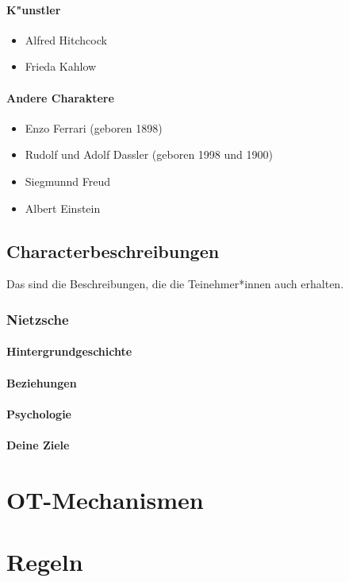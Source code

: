 \documentclass[12pt, a4paper, openany]{report}
\begin{document}
\subsubsection{K"unstler}
\begin{itemize}
	\item Alfred Hitchcock
	\item Frieda Kahlow
\end{itemize}

\subsubsection{Andere Charaktere}
\begin{itemize}
	\item Enzo Ferrari (geboren 1898)
	\item Rudolf und Adolf Dassler (geboren 1998 und 1900)
	\item Siegmunnd Freud
	\item Albert Einstein
\end{itemize}
\section{Characterbeschreibungen}
Das sind die Beschreibungen, die die Teinehmer*innen auch erhalten.

\subsection{Nietzsche}
\subsubsection{Hintergrundgeschichte}
\subsubsection{Beziehungen}
\subsubsection{Psychologie}
\subsubsection{Deine Ziele}


\chapter{OT-Mechanismen}

\chapter{Regeln}
\end{document}
